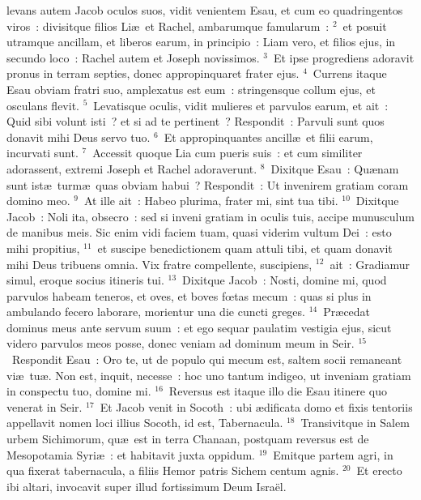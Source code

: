 \bchapter
{}levans autem Jacob oculos suos, vidit venientem Esau, et cum eo quadringentos viros~: divisitque filios Li\ae\ et Rachel, ambarumque famularum~:
${}^{2}$~et posuit utramque ancillam, et liberos earum, in principio~: Liam vero, et filios ejus, in secundo loco~: Rachel autem et Joseph novissimos.
${}^{3}$~Et ipse progrediens adoravit pronus in terram septies, donec appropinquaret frater ejus.
${}^{4}$~Currens itaque Esau obviam fratri suo, amplexatus est eum~: stringensque collum ejus, et osculans flevit.
${}^{5}$~Levatisque oculis, vidit mulieres et parvulos earum, et ait~: Quid sibi volunt isti~? et si ad te pertinent~? Respondit~: Parvuli sunt quos donavit mihi Deus servo tuo.
${}^{6}$~Et appropinquantes ancill\ae\ et filii earum, incurvati sunt.
${}^{7}$~Accessit quoque Lia cum pueris suis~: et cum similiter adorassent, extremi Joseph et Rachel adoraverunt.
${}^{8}$~Dixitque Esau~: Qu\ae nam sunt ist\ae\ turm\ae\ quas obviam habui~? Respondit~: Ut invenirem gratiam coram domino meo.
${}^{9}$~At ille ait~: Habeo plurima, frater mi, sint tua tibi.
${}^{10}$~Dixitque Jacob~: Noli ita, obsecro~: sed si inveni gratiam in oculis tuis, accipe munusculum de manibus meis. Sic enim vidi faciem tuam, quasi viderim vultum Dei~: esto mihi propitius,
${}^{11}$~et suscipe benedictionem quam attuli tibi, et quam donavit mihi Deus tribuens omnia. Vix fratre compellente, suscipiens,
${}^{12}$~ait~: Gradiamur simul, eroque socius itineris tui.
${}^{13}$~Dixitque Jacob~: Nosti, domine mi, quod parvulos habeam teneros, et oves, et boves fœtas mecum~: quas si plus in ambulando fecero laborare, morientur una die cuncti greges.
${}^{14}$~Pr\ae cedat dominus meus ante servum suum~: et ego sequar paulatim vestigia ejus, sicut videro parvulos meos posse, donec veniam ad dominum meum in Seir.
${}^{15}$~Respondit Esau~: Oro te, ut de populo qui mecum est, saltem socii remaneant vi\ae\ tu\ae . Non est, inquit, necesse~: hoc uno tantum indigeo, ut inveniam gratiam in conspectu tuo, domine mi.
${}^{16}$~Reversus est itaque illo die Esau itinere quo venerat in Seir.
${}^{17}$~Et Jacob venit in Socoth~: ubi \ae dificata domo et fixis tentoriis appellavit nomen loci illius Socoth, id est, Tabernacula.
${}^{18}$~Transivitque in Salem urbem Sichimorum, qu\ae\ est in terra Chanaan, postquam reversus est de Mesopotamia Syri\ae~: et habitavit juxta oppidum.
${}^{19}$~Emitque partem agri, in qua fixerat tabernacula, a filiis Hemor patris Sichem centum agnis.
${}^{20}$~Et erecto ibi altari, invocavit super illud fortissimum Deum Isra\"el.


